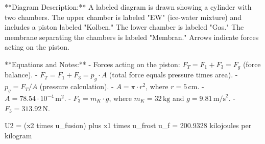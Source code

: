 **Diagram Description:**
A labeled diagram is drawn showing a cylinder with two chambers. The upper chamber is labeled "EW" (ice-water mixture) and includes a piston labeled "Kolben." The lower chamber is labeled "Gas." The membrane separating the chambers is labeled "Membran." Arrows indicate forces acting on the piston.

**Equations and Notes:**
- Forces acting on the piston: \( F_T = F_1 + F_3 = F_g \) (force balance).
- \( F_T = F_1 + F_3 = p_g \cdot A \) (total force equals pressure times area).
- \( p_g = F_T / A \) (pressure calculation).
- \( A = \pi \cdot r^2 \), where \( r = 5 \, \text{cm} \).
- \( A = 78.54 \cdot 10^{-4} \, \text{m}^2 \).
- \( F_3 = m_K \cdot g \), where \( m_K = 32 \, \text{kg} \) and \( g = 9.81 \, \text{m/s}^2 \).
- \( F_3 = 313.92 \, \text{N} \).

U2 = (x2 times u_fusion) plus x1 times u_frost  
u_f = 200.9328 kilojoules per kilogram